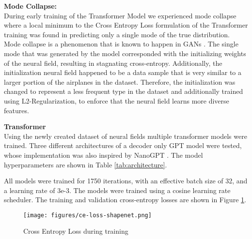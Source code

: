 \noindent
\textbf{Mode Collapse: }\\
During early training of the Transformer Model we experienced mode collapse where a local minimum to the Cross Entropy Loss formulation of the Transformer training was found in predicting only a single mode of the true distribution. Mode collapse is a phenomenon that is known to happen in GANs \cite{9312049}. The single mode that was generated by the model corresponded with the initializing weights of the neural field, resulting in stagnating cross-entropy. Additionally, the initialization neural field happened to be a data sample that is very similar to a larger portion of the airplanes in the dataset. Therefore, the initialization was changed to represent a less frequent type in the dataset and additionally trained using L2-Regularization, to enforce that the neural field learns more diverse features.
\vspace{1em}

\noindent
\textbf{Transformer}\\
Using the newly created dataset of neural fields multiple transformer models were trained. Three different architectures of a decoder only GPT model were tested, whose implementation was also inspired by NanoGPT \cite{Karpathy2022}. The model hyperparameters are shown in Table \ref{tab:architecture}.



All models were trained for 1750 iterations, with an effective batch size of 32, and a learning rate of 3e-3. The models were trained using a cosine learning rate scheduler. The training and validation cross-entropy losses are shown in Figure \ref{fig:loss}.


\begin{figure}[!htbp]
  \centering
  \texttt{[image: figures/ce-loss-shapenet.png]}
  \caption{Cross Entropy Loss during training}
  \label{fig:loss}
\end{figure}


